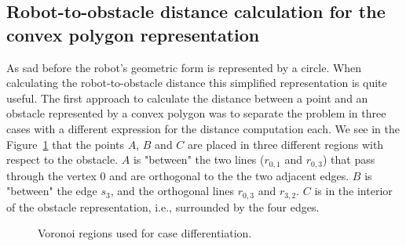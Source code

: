 \subsection{Robot-to-obstacle distance calculation for the convex polygon representation}

As sad before the robot's geometric form is represented by a circle.
When calculating the robot-to-obstacle distance this simplified representation is quite useful. 
The first approach to calculate the distance between a point and an obstacle represented by a convex polygon
was to separate the problem in three cases with a different expression for the distance computation each.
We see in the Figure~\ref{fig:convexpolygon} that the points $A$, $B$ and $C$ are placed in three different
regions with respect to the obstacle. $A$ is "between" the two lines ($r_{0,1}$ and $r_{0,3}$) that pass through
the vertex $0$ and are orthogonal to the the two adjacent edges. $B$ is "between" the edge $s_{3}$, and the
orthogonal lines $r_{0,3}$ and $r_{3,2}$. $C$ is in the interior of the obstacle representation, i.e., surrounded by the four edges.

\begin{figure}[!h]
\centering
{

}
\caption{Voronoi regions used for case differentiation. \label{fig:convexpolygon}}
\end{figure}

